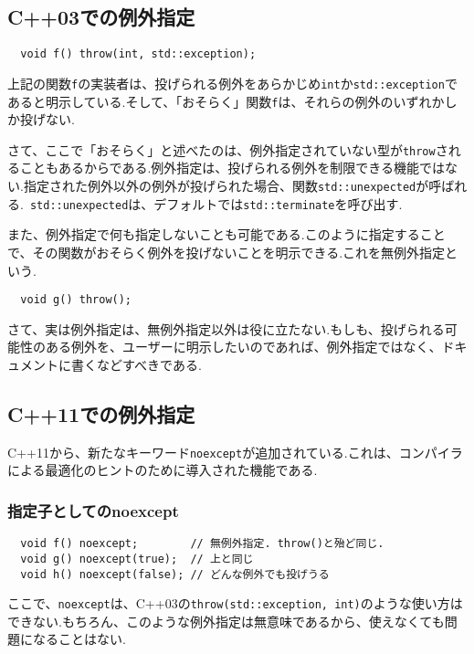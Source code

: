 \documentclass[a4j,11pt,openright]{jsbook}
\begin{document}
\subsection{C++03での例外指定}

\begin{verbatim}
  void f() throw(int, std::exception);
\end{verbatim}

上記の関数\verb|f|の実装者は、投げられる例外をあらかじめ\verb|int|か\verb|std::exception|であると明示している.そして、「おそらく」関数\verb|f|は、それらの例外のいずれかしか投げない.

さて、ここで「おそらく」と述べたのは、例外指定されていない型が\verb|throw|されることもあるからである.例外指定は、投げられる例外を制限できる機能ではない.指定された例外以外の例外が投げられた場合、関数\verb|std::unexpected|が呼ばれる.\ \verb|std::unexpected|は、デフォルトでは\verb|std::terminate|を呼び出す.

また、例外指定で何も指定しないことも可能である.このように指定することで、その関数がおそらく例外を投げないことを明示できる.これを無例外指定という.

\begin{verbatim}
  void g() throw();
\end{verbatim}

さて、実は例外指定は、無例外指定以外は役に立たない.もしも、投げられる可能性のある例外を、ユーザーに明示したいのであれば、例外指定ではなく、ドキュメントに書くなどすべきである.

\subsection{C++11での例外指定}

C++11から、新たなキーワード\verb|noexcept|が追加されている.これは、コンパイラによる最適化のヒントのために導入された機能である.

\subsubsection{指定子としてのnoexcept}

\begin{verbatim}
  void f() noexcept;        // 無例外指定. throw()と殆ど同じ.
  void g() noexcept(true);  // 上と同じ
  void h() noexcept(false); // どんな例外でも投げうる
\end{verbatim}

ここで、\verb|noexcept|は、C++03の\verb|throw(std::exception, int)|のような使い方はできない.もちろん、このような例外指定は無意味であるから、使えなくても問題になることはない.
\end{document}
